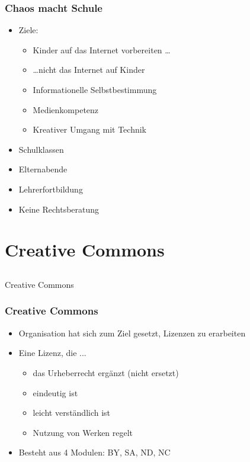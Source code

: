 \documentclass[table]{beamer}
\begin{document}
\begin{frame}
    \frametitle{Chaos macht Schule}
    \begin{itemize}
        \item<2->Ziele:
            \begin{itemize}
                \item<3-> Kinder auf das Internet vorbereiten \ldots
                \item<4-> \ldots nicht das Internet auf Kinder
                \item<5-> Informationelle Selbstbestimmung
                \item<6-> Medienkompetenz
                \item<7-> Kreativer Umgang mit Technik
            \end{itemize}
        \item<8-> Schulklassen
        \item<9-> Elternabende
        \item<10-> Lehrerfortbildung
        \item<11-> Keine Rechtsberatung
    \end{itemize}
\end{frame}

\section{Creative Commons}
\subsection{}

\begin{frame}
    \begin{center}\Large
    Creative Commons
    \end {center}
\end{frame}

\begin{frame}
    \frametitle{Creative Commons}
    \begin{itemize}
        \item<2-> Organisation hat sich zum Ziel gesetzt, Lizenzen zu erarbeiten
        \item<3-> Eine Lizenz, die ...
            \begin{itemize}
                \item<5-> das Urheberrecht ergänzt (nicht ersetzt)
                \item<6-> eindeutig ist
                \item<7-> leicht verständlich ist
                \item<8-> Nutzung von Werken regelt
            \end{itemize}
        \item<9-> Besteht aus 4 Modulen: BY, SA, ND, NC
    \end{itemize}
\end{frame}
\end{document}
